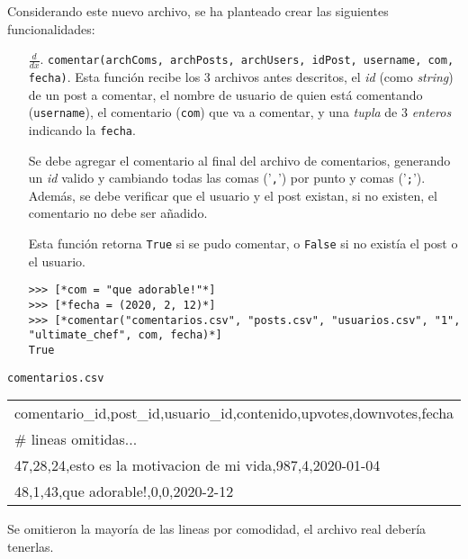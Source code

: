 Considerando este nuevo archivo, se ha planteado crear las siguientes funcionalidades:
\begin{enumerate}

    \item[$\frac{d}{dx}$. ] \texttt{comentar(archComs, archPosts, archUsers, idPost, username, com, fecha)}. Esta función recibe los 3 archivos antes descritos, el \textit{id} (como \textit{string}) de un post a comentar, el nombre de usuario de quien está comentando (\texttt{username}), el comentario (\texttt{com}) que va a comentar, y una \textit{tupla} de 3 \textit{enteros} indicando la \texttt{fecha}.

    Se debe agregar el comentario al final del archivo de comentarios, generando un \textit{id} valido y cambiando todas las comas ('\texttt{,}') por punto y comas ('\texttt{;}'). Además, se debe verificar que el usuario y el post existan, si no existen, el comentario no debe ser añadido.

    Esta función retorna \texttt{True} si se pudo comentar, o \texttt{False} si no existía el post o el usuario.

    \begin{lstlisting}[style=consola]
>>> [*com = "que adorable!"*]
>>> [*fecha = (2020, 2, 12)*]
>>> [*comentar("comentarios.csv", "posts.csv", "usuarios.csv", "1",
"ultimate_chef", com, fecha)*]
True
    \end{lstlisting}

\end{enumerate}

\begin{center}
    \texttt{comentarios.csv} \\
	\begin{tabular}{|l|}
		\hline
comentario\_id,post\_id,usuario\_id,contenido,upvotes,downvotes,fecha\\
\# lineas omitidas... \\
47,28,24,esto es la motivacion de mi vida,987,4,2020-01-04\\
48,1,43,que adorable!,0,0,2020-2-12\\
		\hline
	\end{tabular}

Se omitieron la mayoría de las lineas por comodidad, el archivo real debería tenerlas.
\end{center}

